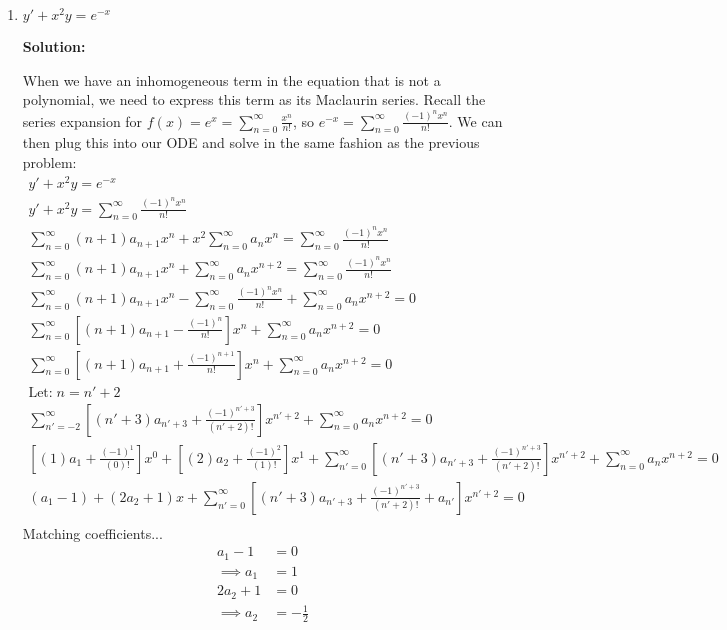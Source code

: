 \documentclass[letterpaper, fontsize=11pt]{scrartcl} %
\numberwithin{equation}{section} %
\numberwithin{figure}{section} %
\numberwithin{table}{section} %
\begin{document}
\begin{enumerate}
\begin{enumerate}
\item $y' + x^2y = e^{-x}$
\par \textbf{Solution:}
\par When we have an inhomogeneous term in the equation that is not a polynomial, we need to express this term as its Maclaurin series. Recall the series expansion for $f(x) = e^{x} = \sum_{n=0}^\infty \frac{x^n}{n!}$, so $e^{-x} = \sum_{n=0}^\infty \frac{(-1)^nx^n}{n!}$. We can then plug this into our ODE and solve in the same fashion as the previous problem:
\begin{gather*}
y' + x^2y = e^{-x} \\
y' + x^2y = \sum_{n=0}^\infty \frac{(-1)^nx^n}{n!}\\
\sum_{n=0}^\infty (n+1) a_{n+1} x^n + x^2\sum_{n=0}^\infty a_n x^n = \sum_{n=0}^\infty \frac{(-1)^nx^n}{n!}\\
\sum_{n=0}^\infty (n+1) a_{n+1} x^n + \sum_{n=0}^\infty a_n x^{n+2} = \sum_{n=0}^\infty \frac{(-1)^nx^n}{n!}\\
\sum_{n=0}^\infty (n+1) a_{n+1} x^n  - \sum_{n=0}^\infty \frac{(-1)^nx^n}{n!} + \sum_{n=0}^\infty a_n x^{n+2} = 0 \\
\sum_{n=0}^\infty \left[ (n+1) a_{n+1}  -  \frac{(-1)^n}{n!}\right]x^n + \sum_{n=0}^\infty a_n x^{n+2} = 0 \\
\sum_{n=0}^\infty \left[ (n+1) a_{n+1}  + \frac{(-1)^{n+1}}{n!}\right]x^n + \sum_{n=0}^\infty a_n x^{n+2} = 0 \\
\text{Let:}\; n = n' + 2\\
\sum_{n'=-2}^\infty \left[ (n'+3) a_{n'+3}  + \frac{(-1)^{n'+3}}{(n'+2)!}\right]x^{n'+2} + \sum_{n=0}^\infty a_n x^{n+2} = 0 \\
\left[(1) a_{1}  + \frac{(-1)^{1}}{(0)!}\right]x^{0} + \left[ (2) a_{2}  + \frac{(-1)^{2}}{(1)!}\right]x^{1} + \sum_{n'=0}^\infty \left[ (n'+3) a_{n'+3}  + \frac{(-1)^{n'+3}}{(n'+2)!}\right]x^{n'+2} + \sum_{n=0}^\infty a_n x^{n+2} = 0 \\
\left(a_1  -1 \right) + \left( 2 a_2  + 1\right)x + \sum_{n'=0}^\infty \left[ (n'+3) a_{n'+3}  + \frac{(-1)^{n'+3}}{(n'+2)!}+ a_{n'} \right]x^{n'+2} = 0 \\
\end{gather*}
Matching coefficients...
\begin{align*}
a_1 - 1 &= 0\\
\implies a_1 &= 1\\
2a_2 + 1 &= 0\\
\implies a_2 &= -\frac{1}{2}\\

\end{align*}
\end{enumerate}
\end{enumerate}
\end{document}
